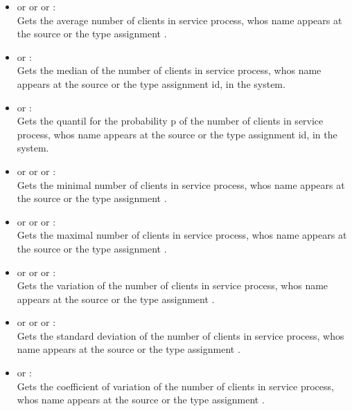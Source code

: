 \begin{itemize}    

\item
{} or  or  or :\\
Gets the average number of clients in service process, whos name appears at the source or the type assignment .

\item
{} or :\\
Gets the median of the number of clients in service process, whos name appears at the source or the type assignment id, in the system.

\item
{} or :\\
Gets the quantil for the probability p of the number of clients in service process, whos name appears at the source or the type assignment id, in the system.

\item
{} or  or  or :\\
Gets the minimal number of clients in service process, whos name appears at the source or the type assignment .

\item
{} or  or  or :\\
Gets the maximal number of clients in service process, whos name appears at the source or the type assignment .

\item
{} or  or  or :\\
Gets the variation of the number of clients in service process, whos name appears at the source or the type assignment .

\item
{} or  or  or :\\
Gets the standard deviation of the number of clients in service process, whos name appears at the source or the type assignment .

\item
{} or :\\
Gets the coefficient of variation of the number of clients in service process, whos name appears at the source or the type assignment .


\end{itemize}
